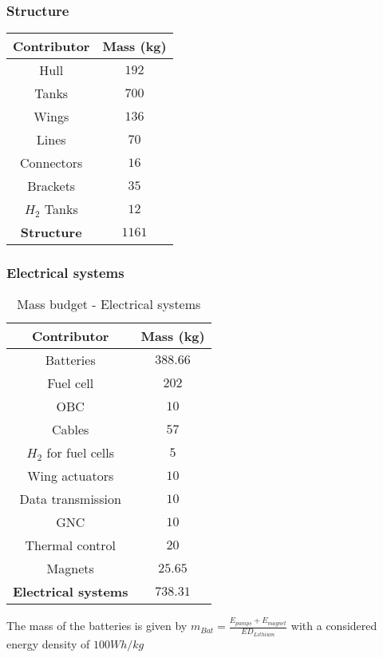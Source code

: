 \subsubsection{Structure}
\begin{table}

\begin{center}
\begin{tabular}[H]{|c|c|}
	\hline
	\cellcolor{gray!50}Contributor & \cellcolor{gray!50}Mass (kg)\\
	\hline
	Hull & $192$\\
	\hline
	Tanks & $700$\\
	\hline
	Wings & $136$\\
	\hline
	Lines & $70$\\
	\hline
	Connectors & $16$\\
	\hline
	Brackets & $35$\\
	\hline
	$H_2$ Tanks & $12$\\
	\hline
	\cellcolor{green!30}\textbf{Structure} & \textbf{$1161$}\\
	\hline
\end{tabular}
\end{center}
\label{Mass budget - Structure}	
\end{table}
\subsubsection{Electrical systems}
\begin{table}
	
\begin{center}
\begin{tabular}[H]{|c|c|}
	\hline
	\cellcolor{gray!50}Contributor & \cellcolor{gray!50}Mass (kg)\\
	\hline
	Batteries & $388.66$\\
	\hline
	Fuel cell & $202$\\
	\hline
	OBC & $10$\\
	\hline
	Cables & $57$\\
	\hline
	$H_2$ for fuel cells & $5$\\
	\hline
	Wing actuators & $10$\\
	\hline
	Data transmission & $10$\\
	\hline
	GNC & $10$\\
	\hline
	Thermal control & $20$\\
	\hline
	Magnets & $25.65$\\
	\hline
	\cellcolor{green!30}\textbf{Electrical systems} & \textbf{$738.31$}\\
	\hline
\end{tabular}
\end{center}
\caption{Mass budget - Electrical systems}
\end{table}
The mass of the batteries is given by $m_{Bat} = \frac{E_{pumps} + E_{magnet}}{ED_{Lithium}}$ with a considered energy density of $100Wh/kg$
